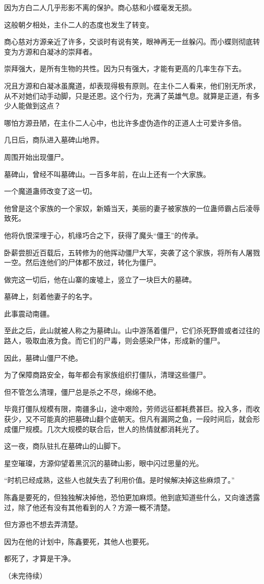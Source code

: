 \begin{this_body}
因为方白二人几乎形影不离的保护。商心慈和小蝶毫发无损。

这般朝夕相处，主仆二人的态度也发生了转变。

商心慈对方源亲近了许多，交谈时有说有笑，眼神再无一丝躲闪。而小蝶则彻底转变为方源和白凝冰的崇拜者。

崇拜强大，是所有生物的共性。因为只有强大，才能有更高的几率生存下去。

况且方源和白凝冰虽魔道，却表现得极有原则。在主仆二人看来，他们别无所求，从不对她们动手动脚，只是还恩。这个行为，充满了英雄气息。就算是正道，有多少人能做到这点？

哪怕方源丑陋，在主仆二人心中，也比许多虚伪造作的正道人士可爱许多倍。

几日后，商队进入墓碑山地界。

周围开始出现僵尸。

墓碑山，曾经不叫墓碑山。一百多年前，在山上还有一个大家族。

一个魔道蛊师改变了这一切。

他曾是这个家族的一个家奴，新婚当天，美丽的妻子被家族的一位蛊师霸占后凌辱致死。

他将仇恨深埋于心，机缘巧合之下，获得了魔头“僵王”的传承。

卧薪尝胆近百载后，五转修为的他挥动僵尸大军，突袭了这个家族，将所有人屠戮一空。然后连他们的尸体都不放过，转化为僵尸。

做完这一切后，他在山寨的废墟上，竖立了一块巨大的墓碑。

墓碑上，刻着他妻子的名字。

此事震动南疆。

至此之后，此山就被人称之为墓碑山。山中游荡着僵尸，它们杀死野兽或者过往的路人，吸取血液为食。而它们的尸毒，则会感染尸体，形成新的僵尸。

因此，墓碑山僵尸不绝。

为了保障商路安全，每年都会有家族组织打僵队，清理这些僵尸。

但不管怎么清理，僵尸总是杀之不尽，绵绵不绝。

毕竟打僵队规模有限，南疆多山，途中艰险，劳师远征都耗费甚巨。投入多，而收获少，又不可能真的把墓碑山翻个底朝天。但凡有漏网之鱼，一段时间后，就会形成僵尸规模。几次大规模的联合后，世人的热情就都消耗光了。

这一夜，商队驻扎在墓碑山的山脚下。

星空璀璨，方源仰望着黑沉沉的墓碑山影，眼中闪过思量的光。

“时机已经成熟，这些人也就失去了利用价值。是时候解决掉这些麻烦了。”

陈鑫是要死的，但独独解决掉他，恐怕更加麻烦。他到底知道些什么，又向谁透露过，除了他还有没有其他看到的人？方源一概不清楚。

但方源也不想去弄清楚。

因为在他的计划中，陈鑫要死，其他人也要死。

都死了，才算是干净。

（未完待续）

\end{this_body}

